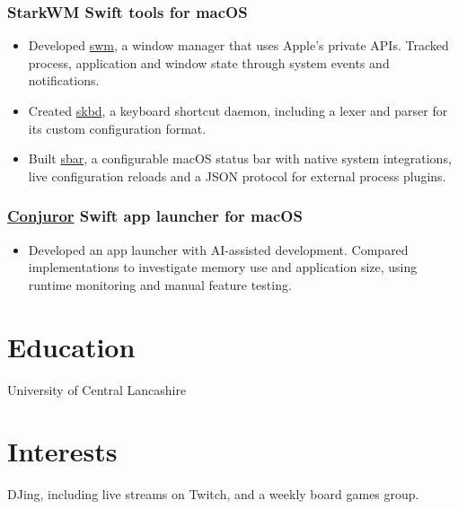 \subsubsection{\textbf{StarkWM} Swift tools for macOS}
\begin{itemize}
    \item Developed \href{https://github.com/starkwm/swm}{swm}, a window manager that uses Apple's private APIs. Tracked process, application and window state through system events and notifications.
    \item Created \href{https://github.com/starkwm/skbd}{skbd}, a keyboard shortcut daemon, including a lexer and parser for its custom configuration format.
    \item Built \href{https://github.com/starkwm/sbar}{sbar}, a configurable macOS status bar with native system integrations, live configuration reloads and a JSON protocol for external process plugins.
\end{itemize}

\subsubsection{\textbf{\href{https://github.com/conjuror-app/conjuror}{Conjuror}} Swift app launcher for macOS}
\begin{itemize}
    \item Developed an app launcher with AI-assisted development. Compared implementations to investigate memory use and application size, using runtime monitoring and manual feature testing.
\end{itemize}

\section{Education}
University of Central Lancashire

\section{Interests}
DJing, including live streams on Twitch, and a weekly board games group.
